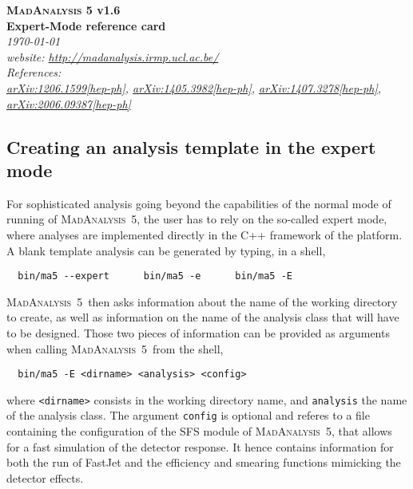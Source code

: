 \documentclass[a4paper]{article}
\newcommand{\MA}{\textsc{MadAnalysis}~5}
\begin{document}
\begin{center} 
{\color{ao} \huge \textbf{\textsc{MadAnalysis} 5 v1.6}} \\ \vspace{0.25cm}
{\color{ao} \huge \textbf{Expert-Mode reference card}} \\ \vspace{0.25cm}
\vspace{0.1cm} \textsl{\today}\\
\vspace{0.1cm} \textsl{website: \url{http://madanalysis.irmp.ucl.ac.be/}}\\
\vspace{0.1cm} \textsl{References:\\ \href{https://arxiv.org/abs/1206.1599}{arXiv:1206.1599[hep-ph]}, \href{https://arxiv.org/abs/1405.3982}{arXiv:1405.3982[hep-ph]}, \href{https://arxiv.org/abs/1407.3278}{arXiv:1407.3278[hep-ph]},
\href{https://arxiv.org/abs/2006.09387}{arXiv:2006.09387[hep-ph]}}
\end{center}

\hspace{0.5cm}

\begin{shaded}
\section{\Large Creating an analysis template in the expert mode}
\end{shaded}

\noindent For sophisticated analysis going beyond the capabilities of the normal mode of
running of \MA, the user has to rely on the so-called expert mode, where
analyses are implemented directly in the C++ framework of the platform. A blank
template analysis can be generated by typing, in a shell,
{\color{ao}\begin{verbatim}
  bin/ma5 --expert      bin/ma5 -e      bin/ma5 -E
\end{verbatim}}
\noindent \MA\ then asks information about the name of the working directory to create, as
well as information on the name of the analysis class that will have to be
designed. Those two pieces of information can be provided as arguments when
calling \MA\ from the shell,
{\color{ao}\begin{verbatim}
  bin/ma5 -E <dirname> <analysis> <config>
\end{verbatim}}
\noindent where \verb+<dirname>+ consists in the working directory name, and
\verb+analysis+ the name of the analysis class. The argument \verb+config+ is
optional and referes to a file containing the configuration of the SFS module
of \MA, that allows for a fast simulation of the detector response. It hence
contains information for both the run of {\sc FastJet} and the efficiency and
smearing functions mimicking the detector effects.\\
\end{document}
